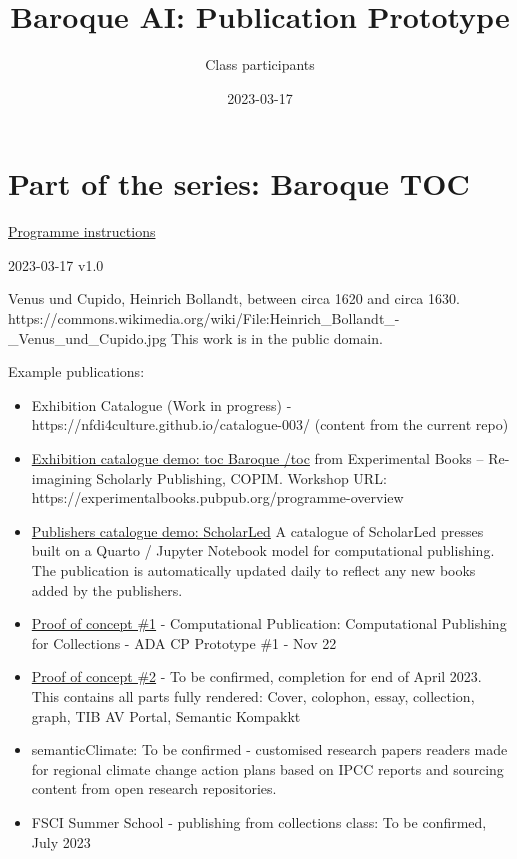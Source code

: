 \documentclass[
  letterpaper,
]{book}
\title{Baroque AI: Publication Prototype}
\author{Class participants}
\date{2023-03-17}
\renewcommand*\contentsname{Table of contents}
\newcommand\contentsname{Table of contents}
\begin{document}
\frontmatter
\maketitle
\ifdefined\Shaded\renewenvironment{Shaded}{\begin{tcolorbox}[interior hidden, borderline west={3pt}{0pt}{shadecolor}, frame hidden, boxrule=0pt, sharp corners, enhanced, breakable]}{\end{tcolorbox}}\fi

\renewcommand*\contentsname{Table of contents}
{
\setcounter{tocdepth}{2}
\tableofcontents
}
\mainmatter
{}

\hypertarget{part-of-the-series-baroque-toc}{%
\chapter{Part of the series: Baroque
TOC}\label{part-of-the-series-baroque-toc}}

\href{https://nfdi4culture.github.io/class-ADA-CP-pipeline/}{Programme
instructions}

2023-03-17 v1.0

Venus und Cupido, Heinrich Bollandt, between circa 1620 and circa 1630.
https://commons.wikimedia.org/wiki/File:Heinrich\_Bollandt\_-\_Venus\_und\_Cupido.jpg
This work is in the public domain.

Example publications:

\begin{itemize}
\item
  Exhibition Catalogue (Work in progress) -
  https://nfdi4culture.github.io/catalogue-003/ (content from the
  current repo)
\item
  \href{https://nfdi4culture.github.io/experimental-books-workshop/}{Exhibition
  catalogue demo: toc Baroque /toc} from Experimental Books --
  Re-imagining Scholarly Publishing, COPIM. Workshop URL:
  https://experimentalbooks.pubpub.org/programme-overview
\item
  \href{https://simonxix.github.io/scholarled_catalogue/}{Publishers
  catalogue demo: ScholarLed} A catalogue of ScholarLed presses built on
  a Quarto / Jupyter Notebook model for computational publishing. The
  publication is automatically updated daily to reflect any new books
  added by the publishers.
\item
  \href{https://nfdi4culture.github.io/cp4c/}{Proof of concept \#1} -
  Computational Publication: Computational Publishing for Collections -
  ADA CP Prototype \#1 - Nov 22
\item
  \href{https://nfdi4culture.github.io/art_catalogue_test/}{Proof of
  concept \#2} - To be confirmed, completion for end of April 2023. This
  contains all parts fully rendered: Cover, colophon, essay, collection,
  graph, TIB AV Portal, Semantic Kompakkt
\item
  semanticClimate: To be confirmed - customised research papers readers
  made for regional climate change action plans based on IPCC reports
  and sourcing content from open research repositories.
\item
  FSCI Summer School - publishing from collections class: To be
  confirmed, July 2023
\end{itemize}
\end{document}
